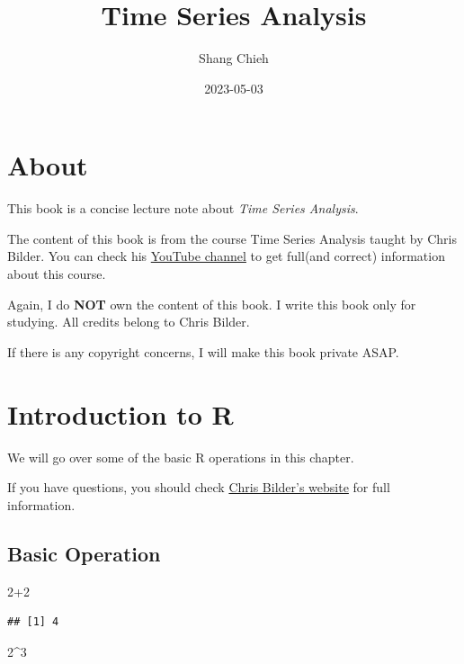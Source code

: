 \documentclass[
]{book}
\title{Time Series Analysis}
\author{Shang Chieh}
\date{2023-05-03}
\newenvironment{Shaded}{\begin{snugshade}}{\end{snugshade}}
\newcommand{\DecValTok}[1]{\textcolor[rgb]{0.00,0.00,0.81}{#1}}
\newcommand{\SpecialCharTok}[1]{\textcolor[rgb]{0.00,0.00,0.00}{#1}}
\theoremstyle{definition}
\theoremstyle{definition}
\theoremstyle{definition}
\theoremstyle{definition}
\theoremstyle{remark}
\begin{document}
\maketitle

{
\setcounter{tocdepth}{1}
\tableofcontents
}
\hypertarget{about}{%
\chapter{About}\label{about}}

This book is a concise lecture note about \emph{Time Series Analysis}.

The content of this book is from the course Time Series Analysis taught by Chris Bilder. You can check his \href{https://www.youtube.com/@ChrisBilder}{YouTube channel} to get full(and correct) information about this course.

Again, I do \textbf{NOT} own the content of this book. I write this book only for studying. All credits belong to Chris Bilder.

If there is any copyright concerns, I will make this book private ASAP.

\hypertarget{introduction-to-r}{%
\chapter{Introduction to R}\label{introduction-to-r}}

We will go over some of the basic R operations in this chapter.

If you have questions, you should check \href{http://www.chrisbilder.com/stat878/sections.html}{Chris Bilder's website} for full information.

\hypertarget{basic-operation}{%
\section{Basic Operation}\label{basic-operation}}

\begin{Shaded}
\begin{Highlighting}[]
\DecValTok{2}\SpecialCharTok{+}\DecValTok{2}
\end{Highlighting}
\end{Shaded}

\begin{verbatim}
## [1] 4
\end{verbatim}

\begin{Shaded}
\begin{Highlighting}[]
\DecValTok{2}\SpecialCharTok{\^{}}\DecValTok{3}
\end{Highlighting}
\end{Shaded}
\end{document}
